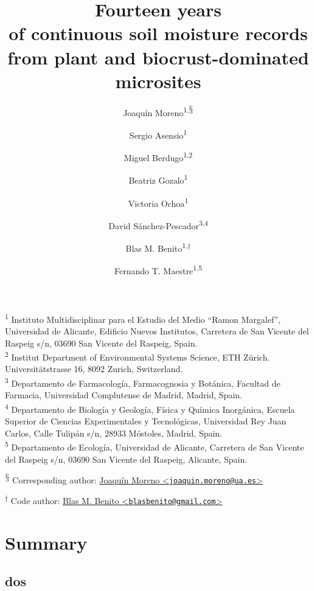 \documentclass[
  table]{article}
\title{Fourteen years\\
of continuous soil moisture records\\
from plant and biocrust-dominated microsites}
\author{Joaquín Moreno\textsuperscript{1,$\mathsection{}$} \and Sergio Asensio\textsuperscript{1} \and Miguel Berdugo\textsuperscript{1,2} \and Beatriz Gozalo\textsuperscript{1} \and Victoria Ochoa\textsuperscript{1} \and David Sánchez-Pescador\textsuperscript{3,4} \and Blas M. Benito\textsuperscript{1,$\dagger{}$} \and Fernando T. Maestre\textsuperscript{1,5}}
\date{}
\begin{document}
\maketitle

\textsuperscript{1} Instituto Multidisciplinar para el Estudio del Medio
``Ramon Margalef'', Universidad de Alicante, Edificio Nuevos Institutos,
Carretera de San Vicente del Raspeig s/n, 03690 San Vicente del Raspeig,
Spain.\\
\textsuperscript{2} Institut Department of Environmental Systems
Science, ETH Zürich. Universitätstrasse 16, 8092 Zurich, Switzerland.\\
\textsuperscript{3} Departamento de Farmacología, Farmacognosia y
Botánica, Facultad de Farmacia, Universidad Complutense de Madrid,
Madrid, Spain.\\
\textsuperscript{4} Departamento de Biología y Geología, Física y
Química Inorgánica, Escuela Superior de Ciencias Experimentales y
Tecnológicas, Universidad Rey Juan Carlos, Calle Tulipán s/n, 28933
Móstoles, Madrid, Spain.\\
\textsuperscript{5} Departamento de Ecología, Universidad de Alicante,
Carretera de San Vicente del Raspeig s/n, 03690 San Vicente del Raspeig,
Alicante, Spain.

\textsuperscript{$\mathsection{}$} Corresponding author:
\href{mailto:joaquin.moreno@ua.es}{Joaquín Moreno
\textless{}\href{mailto:joaquin.moreno@ua.es}{\nolinkurl{joaquin.moreno@ua.es}}\textgreater{}}

\textsuperscript{$\dagger{}$} Code author:
\href{mailto:blasbenito@gmail.com}{Blas M. Benito
\textless{}\href{mailto:blasbenito@gmail.com}{\nolinkurl{blasbenito@gmail.com}}\textgreater{}}

\let\thefootnote\relax{}

\newpage 
\tableofcontents

\hypertarget{summary}{%
\section{Summary}\label{summary}}

\hypertarget{dos}{%
\subsection{dos}\label{dos}}
\end{document}
